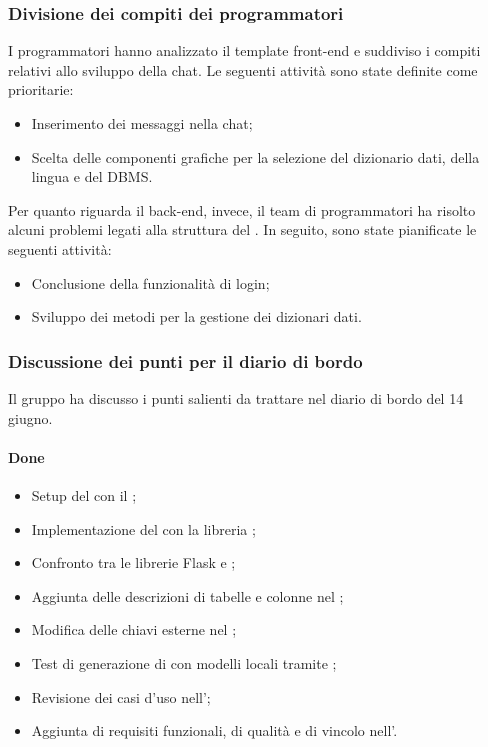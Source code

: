\subsubsection{Divisione dei compiti dei programmatori}
\par I programmatori hanno analizzato il template front-end e suddiviso i compiti relativi allo sviluppo della chat. Le seguenti attività sono state definite come prioritarie:
\begin{itemize}
	\item Inserimento dei messaggi nella chat;
	\item Scelta delle componenti grafiche per la selezione del dizionario dati, della lingua e del DBMS.
\end{itemize}
\par Per quanto riguarda il back-end, invece, il team di programmatori ha risolto alcuni problemi legati alla struttura del . In seguito, sono state pianificate le seguenti attività:
\begin{itemize}
	\item Conclusione della funzionalità di login;
	\item Sviluppo dei metodi per la gestione dei dizionari dati.
\end{itemize}

\subsubsection{Discussione dei punti per il diario di bordo}
\par Il gruppo ha discusso i punti salienti da trattare nel diario di bordo del 14 giugno.
\paragraph{Done}
\begin{itemize}
	\item Setup del  con il  ;
	\item Implementazione del  con la libreria ;
	\item Confronto tra le librerie Flask e ;
	\item Aggiunta delle descrizioni di tabelle e colonne nel ;
	\item Modifica delle chiavi esterne nel ;
	\item Test di generazione di  con modelli locali tramite ;
	\item Revisione dei casi d'uso nell'\AdR;
	\item Aggiunta di requisiti funzionali, di qualità e di vincolo nell'\AdR.
	
\end{itemize}
